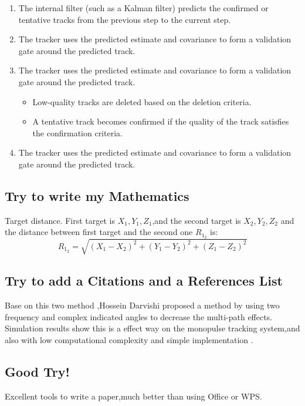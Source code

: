 \documentclass{article}
\begin{document}
\begin{enumerate}
\item The internal filter (such as a Kalman filter) predicts the confirmed or tentative tracks from the previous step to the current step.
\item The tracker uses the predicted estimate and covariance to form a validation gate around the predicted track.
\item The tracker uses the predicted estimate and covariance to form a validation gate around the predicted track.

\begin{itemize}
\item Low-quality tracks are deleted based on the deletion criteria.
\item A tentative track becomes confirmed if the quality of the track satisfies the confirmation criteria.
\end{itemize}
\item The tracker uses the predicted estimate and covariance to form a validation gate around the predicted track.
\end{enumerate}

\subsection{Try to write my Mathematics}

Target distance. First target is $X_1, Y_1,Z_1$,and the second target is $X_2, Y_2,Z_2$ and the distance between first target and the second one $R_1_2$ is:
\[R_1_2 = \sqrt{(X_1-X_2)^2+(Y_1-Y_2)^2+(Z_1-Z_2)^2}\]



\subsection{Try to add a Citations and a References List}
Base on this two method ,Hossein Darvishi proposed a method by using two frequency and complex indicated angles to decrease the multi-path effects. Simulation results show this is a effect way on the monopulse tracking system,and also with low computational complexity and simple implementation\cite{D1} . 


\subsection{Good Try!}

Excellent tools to write a paper,much better than using Office or WPS.



\end{document}
